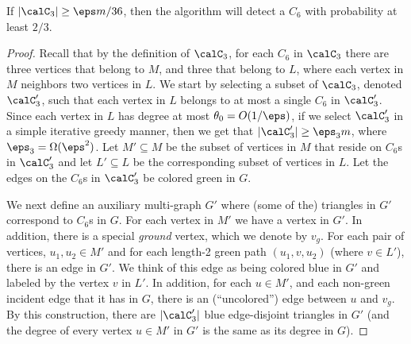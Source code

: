 \begin{claim}\label{clm:C6-3}
If $|\calC_3| \geq \eps m/36$, then the algorithm will detect a $C_6$ with probability at least $2/3$.
\end{claim}



\begin{proof}
Recall that by the definition of $\calC_3$, for each $C_6$ in $\calC_3$ there are three vertices that belong to $M$, and three that belong to $L$, where each vertex in $M$ neighbors two vertices in $L$.
We start by selecting a subset of $\calC_3$, denoted $\calC_3'$, such that each vertex in $L$ belongs to at most a single $C_6$ in $\calC_3'$. Since each vertex in $L$ has degree at most  $\theta_0 = O(1/\eps)$, if we select $\calC_3'$ in a simple iterative greedy manner, then we get that
$|\calC_3'| \geq \eps_3 m$, where $\eps_3 = \Omega(\eps^2)$. Let $M'\subseteq M$ be the subset of vertices in $M$ that reside on $C_6$s in $\calC_3'$ and let $L'\subseteq L$ be the corresponding subset of vertices in  $L$. Let the edges on the
$C_6$s in $\calC_3'$ be colored green in $G$.

We next define an auxiliary multi-graph $G'$ 
    where (some of the) triangles in $G'$ correspond to $C_6$s in $G$. 
%
For each vertex in $M'$  we have a vertex in $G'$. In addition, there is a special \emph{ground} vertex, which we denote by $v_g$. For each pair of vertices, $u_1,u_2\in M'$ and for each length-2 green path $(u_1,v,u_2)$ (where $v\in L'$), there is an edge in $G'$. We think of this edge as being colored blue in $G'$ and labeled by the vertex $v$ in $L'$.
In addition, for each  $u\in M'$, and each non-green incident edge that it has in $G$, there is an (``uncolored'') edge between $u$ and $v_g$.
By this construction, there are $|\calC_3'|$ blue edge-disjoint triangles in $G'$ (and the degree of every vertex $u\in M'$ in $G'$ is the same as its degree in $G$).


\end{proof}
